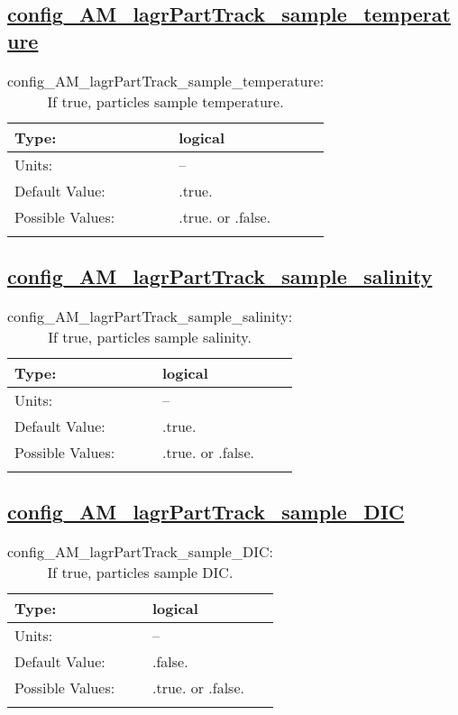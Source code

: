 \subsection[config\_AM\_lagrPartTrack\_sample\_temperature]{\hyperref[sec:nm_tab_AM_lagrPartTrack]{config\_AM\_lagrPartTrack\_sample\_temperature}}
\label{subsec:nm_sec_config_AM_lagrPartTrack_sample_temperature}
\begin{center}
\begin{longtable}{| p{2.0in} || p{4.0in} |}
    \hline
    Type: & logical \\
    \hline
    Units: & -- \\
    \hline
    Default Value: & .true. \\
    \hline
    Possible Values: & .true. or .false. \\
    \hline
    \caption{config\_AM\_lagrPartTrack\_sample\_temperature: If true, particles sample temperature.}
\end{longtable}
\end{center}
\subsection[config\_AM\_lagrPartTrack\_sample\_salinity]{\hyperref[sec:nm_tab_AM_lagrPartTrack]{config\_AM\_lagrPartTrack\_sample\_salinity}}
\label{subsec:nm_sec_config_AM_lagrPartTrack_sample_salinity}
\begin{center}
\begin{longtable}{| p{2.0in} || p{4.0in} |}
    \hline
    Type: & logical \\
    \hline
    Units: & -- \\
    \hline
    Default Value: & .true. \\
    \hline
    Possible Values: & .true. or .false. \\
    \hline
    \caption{config\_AM\_lagrPartTrack\_sample\_salinity: If true, particles sample salinity.}
\end{longtable}
\end{center}
\subsection[config\_AM\_lagrPartTrack\_sample\_DIC]{\hyperref[sec:nm_tab_AM_lagrPartTrack]{config\_AM\_lagrPartTrack\_sample\_DIC}}
\label{subsec:nm_sec_config_AM_lagrPartTrack_sample_DIC}
\begin{center}
\begin{longtable}{| p{2.0in} || p{4.0in} |}
    \hline
    Type: & logical \\
    \hline
    Units: & -- \\
    \hline
    Default Value: & .false. \\
    \hline
    Possible Values: & .true. or .false. \\
    \hline
    \caption{config\_AM\_lagrPartTrack\_sample\_DIC: If true, particles sample DIC.}
\end{longtable}
\end{center}
